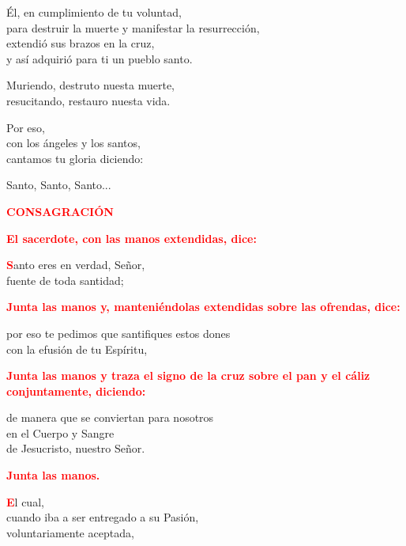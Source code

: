 \documentclass[12pt, letterpaper]{report}
\begin{document}
\'El, en cumplimiento de tu voluntad, \\
para destruir la muerte y manifestar la resurrecci\'on, \\
extendi\'o sus brazos en la cruz, \\
y as\'i adquiri\'o para ti un pueblo santo. \newline

Muriendo, destruto nuesta muerte, \\
resucitando, restauro nuesta vida. \newline

Por eso, \\
con los \'angeles y los santos, \\
cantamos tu gloria diciendo: \newline

Santo, Santo, Santo...

\newpage

\Large {\bfseries \textcolor{red}{CONSAGRACI\'ON}} \newline

\large{\bfseries \textcolor{red}{El sacerdote, con las manos extendidas, dice:}}

\lettrine[lines=1]{\bfseries \textcolor{red}{S}}{}\Large anto eres en verdad, Se\~nor,\\
fuente de toda santidad;\newline

\large{\bfseries \textcolor{red}{Junta las manos y, manteni\'endolas extendidas sobre las ofrendas, dice:}}\newline

\Large por eso te pedimos que santifiques estos dones\\
con la efusi\'on de tu Esp\'iritu,\newline

\large{\bfseries \textcolor{red}{Junta las manos y traza el signo de la cruz sobre el pan y el c\'aliz conjuntamente, diciendo:}}\newline

\Large de manera que se conviertan para nosotros\\
en el Cuerpo y \Huge{\textcolor{red}{}} \Large Sangre\\
de Jesucristo, nuestro Se\~nor.\newline

\large{\bfseries \textcolor{red}{Junta las manos.}}

\lettrine[lines=1]{\bfseries \textcolor{red}{E}}{}\Large l cual,\\
cuando iba a ser entregado a su Pasi\'on,\\
voluntariamente aceptada,\newline
\end{document}
